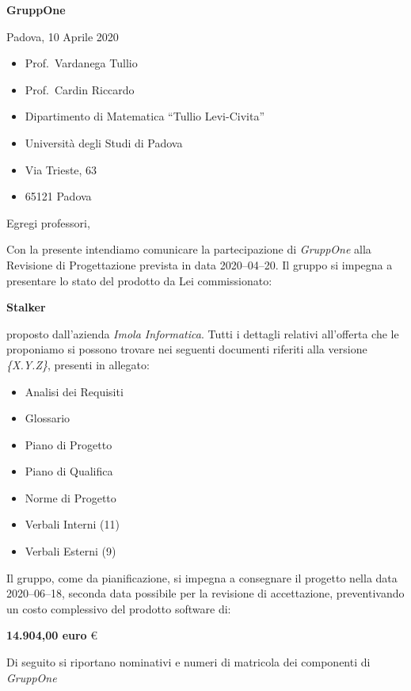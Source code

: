 \documentclass{article}
\newcommand{\placeholder}[1]{\textit{\{#1\}}} %
\begin{document}
\begin{center}
  {\LARGE \textbf{GruppOne}}
\end{center}

\begin{multicols}{2}
  Padova, 10 Aprile 2020
  \columnbreak{}
  \begin{itemize}
    \setlength{\itemsep}{0mm}
    \setlength{\parskip}{0mm}
    \renewcommand{\labelitemi}{}
    \item Prof.\ Vardanega Tullio
    \item Prof.\ Cardin Riccardo
    \item Dipartimento di Matematica ``Tullio Levi-Civita''
    \item Università degli Studi di Padova
    \item Via Trieste, 63
    \item 65121 Padova
  \end{itemize}
\end{multicols}
Egregi professori,

Con la presente intendiamo comunicare la partecipazione di \textit{GruppOne} alla Revisione di Progettazione prevista in data 2020--04--20.
Il gruppo si impegna a presentare lo stato del prodotto da Lei commissionato:
\begin{center}
  \textbf{Stalker}
\end{center}
proposto dall'azienda \textit{Imola Informatica}.
Tutti i dettagli relativi all'offerta che le proponiamo si possono trovare nei seguenti documenti riferiti alla versione \placeholder{X.Y.Z}, presenti in allegato:
\begin{itemize}
  \item Analisi dei Requisiti
  \item Glossario
  \item Piano di Progetto
  \item Piano di Qualifica
  \item Norme di Progetto
  \item Verbali Interni (11)
  \item Verbali Esterni (9)
\end{itemize}

Il gruppo, come da pianificazione, si impegna a consegnare il progetto nella data 2020--06--18, seconda data possibile per la revisione di accettazione, preventivando un costo complessivo del prodotto software di:
\begin{center}
  \textbf{14.904,00 euro} €
\end{center}
\newpage
Di seguito si riportano nominativi e numeri di matricola dei componenti di \textit{GruppOne}
\end{document}
